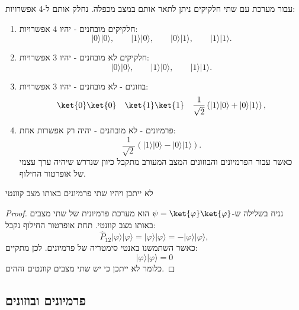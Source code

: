 \documentclass{tstextbook}
\begin{document}
\begin{proposition}
עבור מערכת עם שתי חלקיקים ניתן לתאר אותם במצב מכפלה. נחלק אותם ל-4 אפשרויות:

  \begin{enumerate}
    \item חלקיקים מובחנים - יהיו 4 אפשרויות: 
$$|0\rangle|0\rangle,\qquad|1\rangle|0\rangle,\qquad|0\rangle|1\rangle,\qquad|1\rangle|1\rangle.$$


    \item חלקיקים לא מובחנים - יהיו 3 אפשרויות: 
$$|0\rangle|0\rangle,\qquad|1\rangle|0\rangle,\qquad|1\rangle|1\rangle.$$


    \item בוזונים - לא מובחנים - יהיו 3 אפשרויות: 
$$\ket{0} \ket{0} \quad \ket{1} \ket{1} \quad \frac{1}{\sqrt{2}}\left(|1\rangle|0\rangle+|0\rangle|1\rangle\right),$$


    \item פרמיונים - לא מובחנים - יהיה רק אפשרות אחת: 
$$\frac{1}{\sqrt{2}}\left(|1\rangle|0\rangle-|0\rangle|1\rangle\right).$$
כאשר עבור הפרמיונים והבוזונים המצב המעורב מתקבל כיוון שנדרש שיהיה ערך עצמי של אופרטור החילוף.


  \end{enumerate}
\end{proposition}
\begin{proposition}
לא ייתכן ויהיו שתי פרמיונים באותו מצב קוונטי

\end{proposition}
\begin{proof}
נניח בשלילה ש-\(\psi=\ket{\varphi}\ket{\varphi}\) הוא מערכת פרמיונית של שתי מצבים באותו מצב קוונטי. תחת אופרטור החילוף נקבל:
$$\hat{P}_{12}|\varphi\rangle|\varphi\rangle=|\varphi\rangle|\varphi\rangle=-|\varphi\rangle|\varphi\rangle,$$
כאשר השתמשנו באנטי סימטריה של פרמיונים. לכן מתקיים:
$$|\varphi\rangle|\varphi\rangle=0$$
כלומר לא ייתכן כי יש שתי מצבים קוונטים זההים. 

\end{proof}
\subsection{פרמיונים ובוזונים}
\end{document}
